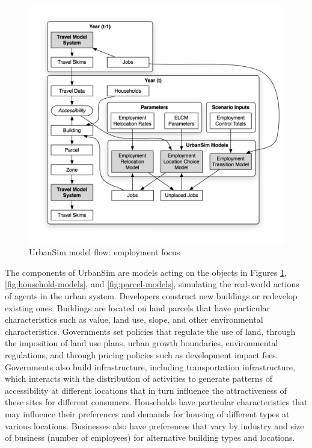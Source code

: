 \begin{figure}[htbp]
    \center
    \includegraphics[width=\textwidth]{graphics/ParcelEmploymentModel.png}
    \caption{UrbanSim model flow: employment focus}
    \label{fig:employment-models}
\end{figure}

The components of UrbanSim are models acting on the objects in Figures \ref{fig:employment-models}, \ref{fig:household-models}, and \ref{fig:parcel-models}, simulating the real-world actions of agents in the urban system. Developers construct new buildings or redevelop existing ones. Buildings are located on land parcels that have particular characteristics such as value, land use, slope, and other environmental characteristics. Governments set policies that regulate the use of land, through the imposition of land use plans, urban growth boundaries, environmental regulations, and through pricing policies such as development impact fees. Governments also build infrastructure, including transportation infrastructure, which interacts with the distribution of activities to generate patterns of accessibility at different locations that in turn influence the attractiveness of these sites for different consumers. Households have particular characteristics that may influence their preferences and demands for housing of different types at various locations. Businesses also have preferences that vary by industry and size of business (number of employees) for alternative building types and locations.

